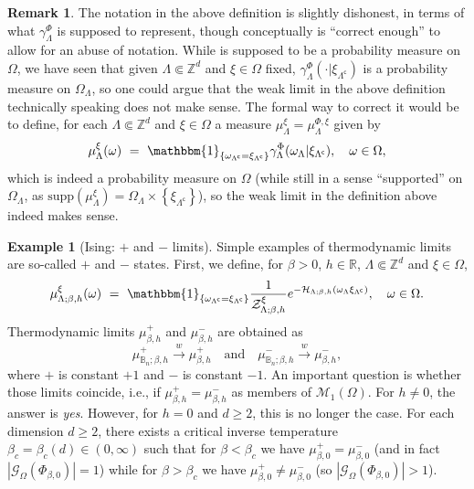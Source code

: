 \documentclass[12pt]{article}
\newcommand{\BBB}{\mathbb{B}}
\newcommand{\G}{\mathcal{G}}
\renewcommand{\H}{\mathcal{H}}
\newcommand{\M}{\mathcal{M}}
\newcommand{\R}{\mathbb{R}}
\newcommand{\Z}{\mathbb{Z}}
\newcommand{\ZZ}{\mathcal{Z}}
\newcommand{\set}[1]{\left\{#1\right\}}
\newcommand{\pika}{\boldsymbol{\cdot}}
\newcommand{\1}{\mathbbm{1}}
\renewcommand{\c}{\mathsf{c}}
\newcommand{\supp}{\mathrm{supp}}
\newcommand{\5}{\vspace{0.5cm}}
\theoremstyle{definition}
\newtheorem{ex}[thm]{Example}
\newtheorem{rem}[thm]{Remark}
\begin{document}
\begin{rem}
The notation in the above definition is slightly dishonest, in terms of what $\gamma_\Lambda^\Phi$ is supposed to represent, though conceptually is ``correct enough'' to allow for an abuse of notation. While is supposed to be a probability measure on $\Omega$, we have seen that given $\Lambda\Subset\Z^d$ and $\xi\in\Omega$ fixed, $\gamma_\Lambda^\Phi(\pika|\xi_{\Lambda^\c})$ is a probability measure on $\Omega_\Lambda$, so one could argue that the weak limit in the above definition technically speaking does not make sense. The formal way to correct it would be to define, for each $\Lambda\Subset\Z^d$ and $\xi\in\Omega$ a measure $\mu_\Lambda^\xi=\mu_\Lambda^{\Phi,\xi}$ given by
$$\mu_\Lambda^\xi(\omega) ~=~ \1_{\set{\omega_{\Lambda^\c}=\xi_{\Lambda^\c}}}\gamma_\Lambda^\Phi(\omega_\Lambda|\xi_{\Lambda^\c}), \quad \omega\in\Omega,$$
which is indeed a probability measure on $\Omega$ (while still in a sense ``supported'' on $\Omega_\Lambda$, as $\supp(\mu_\Lambda^\xi)=\Omega_\Lambda\times\set{\xi_{\Lambda^\c}}$), so the weak limit in the definition above indeed makes sense.
\end{rem}

\begin{ex}[Ising: $+$ and $-$ limits]
Simple examples of thermodynamic limits are so-called $+$ and $-$ states. First, we define, for $\beta>0$, $h\in\R$, $\Lambda\Subset\Z^d$ and $\xi\in\Omega$,
$$\mu_{\Lambda;\beta,h}^\xi(\omega) ~=~ \1_{\set{\omega_{\Lambda^\c}=\xi_{\Lambda^\c}}}\frac{1}{\ZZ_{\Lambda;\beta,h}^\xi}e^{-\H_{\Lambda;\beta,h}(\omega_\Lambda\xi_{\Lambda^\c})}, \quad \omega\in\Omega.$$
Thermodynamic limits $\mu_{\beta,h}^{+}$ and $\mu_{\beta,h}^{-}$ are obtained as 
$$\mu_{\BBB_n;\beta,h}^+\xrightarrow{w}\mu_{\beta,h}^+ \quad\text{and}\quad \mu_{\BBB_n;\beta,h}^-\xrightarrow{w}\mu_{\beta,h}^-,$$
where $+$ is constant $+1$ and $-$ is constant $-1$. An important question is whether those limits coincide, i.e., if $\mu_{\beta,h}^+=\mu_{\beta,h}^-$ as members of $\M_1(\Omega)$. For $h\neq 0$, the answer is \textit{yes}. However, for $h=0$ and $d\geq 2$, this is no longer the case. For each dimension $d\geq 2$, there exists a critical inverse temperature $\beta_c=\beta_c(d)\in(0,\infty)$ such that for $\beta<\beta_c$ we have $\mu_{\beta,0}^+=\mu_{\beta,0}^-$ (and in fact $|\G_\Omega(\Phi_{\beta,0})|=1$) while for $\beta>\beta_c$ we have $\mu_{\beta,0}^+\neq\mu_{\beta,0}^-$ (so $|\G_{\Omega}(\Phi_{\beta,0})|>1$).
\end{ex}
\end{document}
